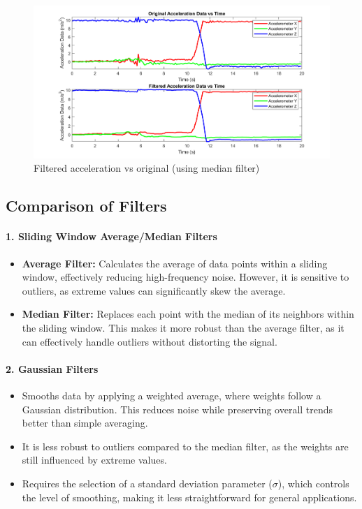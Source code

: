 \documentclass[12pt]{article}
\begin{document}
\begin{figure}[H]
    \centerline{\includegraphics[scale=0.8]{Imagens/originalaccelerationvsfiltered.png}}
    \caption{Filtered acceleration vs original (using median filter)}
    \label{fig}
\end{figure}


\subsection*{Comparison of Filters}

\paragraph{1. Sliding Window Average/Median Filters}
\begin{itemize}
    \item \textbf{Average Filter:} 
    Calculates the average of data points within a sliding window, effectively reducing high-frequency noise. However, it is sensitive to outliers, as extreme values can significantly skew the average.
    \item \textbf{Median Filter:} 
    Replaces each point with the median of its neighbors within the sliding window. This makes it more robust than the average filter, as it can effectively handle outliers without distorting the signal.
\end{itemize}

\paragraph{2. Gaussian Filters}
\begin{itemize}
    \item Smooths data by applying a weighted average, where weights follow a Gaussian distribution. This reduces noise while preserving overall trends better than simple averaging.
    \item It is less robust to outliers compared to the median filter, as the weights are still influenced by extreme values.
    \item Requires the selection of a standard deviation parameter (\(\sigma\)), which controls the level of smoothing, making it less straightforward for general applications.
\end{itemize}
\end{document}
